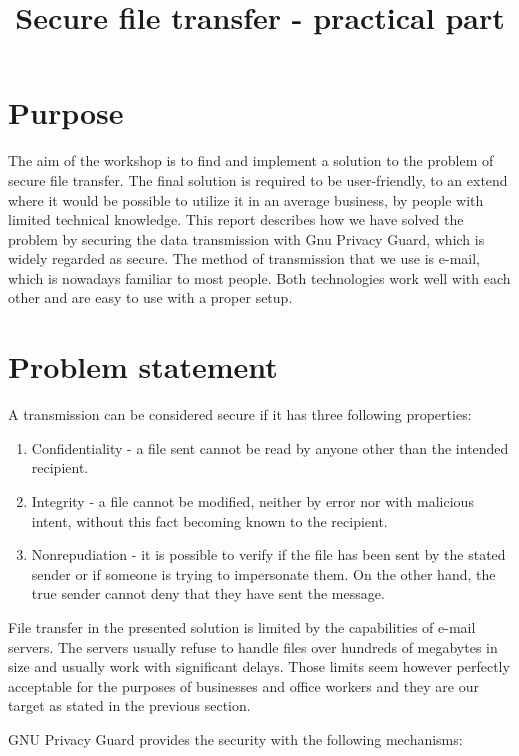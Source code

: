 \documentclass{classrep}
\author{
  \studentinfo{Michał Sośnicki}{207597} \and
  \studentinfo{Daniel Pęczek}{207585}
}
\title{Secure file transfer - practical part}
\begin{document}
\maketitle
\newpage

\section{Purpose}

The aim of the workshop is to find and implement a solution to the problem of secure file transfer. 
The final solution is required to be user-friendly, to an extend where it would be possible to utilize 
it in an average business, by people with limited technical knowledge. This report describes how we
have solved the problem by securing the data transmission with Gnu Privacy Guard, which is widely
regarded as secure. The method of transmission that we use is e-mail, which is nowadays familiar to
most people. Both technologies work well with each other and are easy to use with a proper setup.

\section{Problem statement}

A transmission can be considered secure if it has three following properties: 

\begin{enumerate}
\item Confidentiality - a file sent cannot be read by anyone other than the intended recipient.
\item Integrity - a file cannot be modified, neither by error nor with malicious intent, without this fact becoming known to the recipient.
\item Nonrepudiation - it is possible to verify if the file has been sent by the stated sender or if someone is trying to impersonate them. On the other hand, the true sender cannot deny that they have sent the message. 
\end{enumerate}

File transfer in the presented solution is limited by the capabilities of e-mail servers. The servers
usually refuse to handle files over hundreds of megabytes in size and usually work with significant
delays. Those limits seem however perfectly acceptable for the purposes of businesses and office
workers and they are our target as stated in the previous section.

GNU Privacy Guard provides the security with the following mechanisms:
\end{document}
